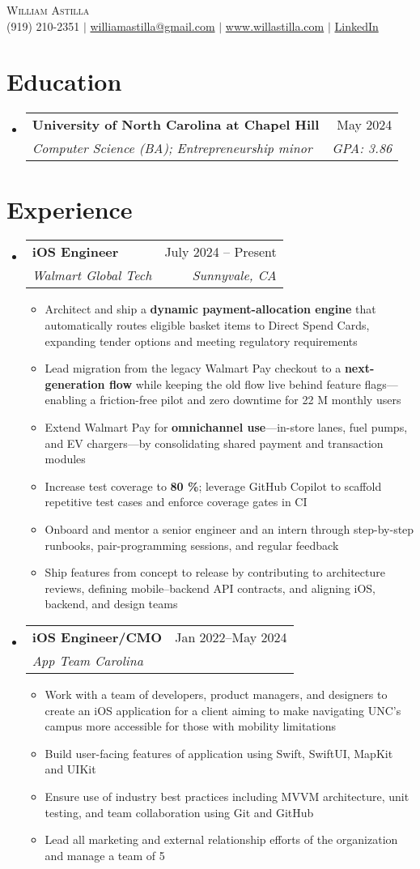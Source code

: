 \documentclass[letterpaper,11pt]{article}
\makeatletter
\newcommand{\resumeItem}[1]{
  \item\small{{#1}}
}
\newcommand{\resumeExperience}[4]{
  \vspace{-2pt}\item
    \begin{tabular*}{0.97\textwidth}[t]{l@{\extracolsep{\fill}}r}
      \textbf{#1} & #2 \\
      \textit{#3} & \textit{#4} \\
    \end{tabular*}
}
\newcommand{\resumeSubheading}[4]{
  \vspace{-2pt}\item
    \begin{tabular*}{0.97\textwidth}[t]{l@{\extracolsep{\fill}}r}
      \textbf{#1} & #2 \\
      \textit{\small#3} & \textit{\small #4} \\
    \end{tabular*}\vspace{-7pt}
}
\newcommand{\resumeSubHeadingListStart}{\begin{itemize}[leftmargin=0.15in, label={}]}
\newcommand{\resumeSubHeadingListEnd}{\end{itemize}}
\newcommand{\resumeItemListStart}{\begin{itemize}}
\newcommand{\resumeItemListEnd}{\end{itemize}\vspace{-5pt}}
\makeatother
\begin{document}
\begin{center}
    {\Huge \scshape William Astilla} \\ \vspace{2pt}
    \small
    (919) 210-2351 $|$ \href{mailto:williamastilla@gmail.com}{williamastilla@gmail.com} $|$ \href{https://www.willastilla.com}{www.willastilla.com} $|$ \href{https://www.linkedin.com/in/willastilla}{LinkedIn}
\end{center}

\section{Education}
  \resumeSubHeadingListStart
    \resumeSubheading
      {University of North Carolina at Chapel Hill}{May 2024}
      {Computer Science (BA); Entrepreneurship minor}{\textit{GPA: 3.86}}
  \resumeSubHeadingListEnd

\section{Experience}
  \resumeSubHeadingListStart
  \resumeExperience
    {iOS Engineer}{July 2024 -- Present}{Walmart Global Tech}{Sunnyvale, CA}
    \resumeItemListStart
      \resumeItem{Architect and ship a \textbf{dynamic payment-allocation engine} that automatically routes eligible basket items to Direct Spend Cards, expanding tender options and meeting regulatory requirements}
      \resumeItem{Lead migration from the legacy Walmart Pay checkout to a \textbf{next-generation flow} while keeping the old flow live behind feature flags—enabling a friction-free pilot and zero downtime for 22 M monthly users}
      \resumeItem{Extend Walmart Pay for \textbf{omnichannel use}—in-store lanes, fuel pumps, and EV chargers—by consolidating shared payment and transaction modules}
      \resumeItem{Increase test coverage to \textbf{80 \%}; leverage GitHub Copilot to scaffold repetitive test cases and enforce coverage gates in CI}
      \resumeItem{Onboard and mentor a senior engineer and an intern through step-by-step runbooks, pair-programming sessions, and regular feedback}
      \resumeItem{Ship features from concept to release by contributing to architecture reviews, defining mobile–backend API contracts, and aligning iOS, backend, and design teams}
    \resumeItemListEnd
    \resumeExperience
      {iOS Engineer/CMO}{Jan 2022--May 2024}{App Team Carolina}{ }
      \resumeItemListStart
        \resumeItem{Work with a team of developers, product managers, and designers to create an iOS application for a client aiming to make navigating UNC's campus more accessible for those with mobility limitations}
        \resumeItem{Build user-facing features of application using Swift, SwiftUI, MapKit and UIKit}
        \resumeItem{Ensure use of industry best practices including MVVM architecture, unit testing, and team collaboration using Git and GitHub}
        \resumeItem{Lead all marketing and external relationship efforts of the organization and manage a team of 5}
      \resumeItemListEnd
  \resumeSubHeadingListEnd
\end{document}
